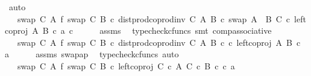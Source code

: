 \begin{isabellebody}
\ auto\isanewline
\ \ \isamarkupfalse%
\ \isamarkupfalse%
\ {\isachardoublequoteopen}{\isachardot}{\kern0pt}{\isachardot}{\kern0pt}{\isachardot}{\kern0pt}\ {\isacharequal}{\kern0pt}\ {\isacharparenleft}{\kern0pt}swap\ C\ A\ {\isasymbowtie}\isactrlsub f\ swap\ C\ B{\isacharparenright}{\kern0pt}\ {\isasymcirc}\isactrlsub c\ dist{\isacharunderscore}{\kern0pt}prod{\isacharunderscore}{\kern0pt}coprod{\isacharunderscore}{\kern0pt}inv\ C\ A\ B\ {\isasymcirc}\isactrlsub c\ swap\ {\isacharparenleft}{\kern0pt}A\ {\isasymCoprod}\ B{\isacharparenright}{\kern0pt}\ C\ {\isasymcirc}\isactrlsub c\ {\isasymlangle}left{\isacharunderscore}{\kern0pt}coproj\ A\ B\ {\isasymcirc}\isactrlsub c\ a{\isacharcomma}{\kern0pt}\ c{\isasymrangle}{\isachardoublequoteclose}\isanewline
\ \ \ \ \isamarkupfalse%
\ assms\ \isamarkupfalse%
\ {\isacharparenleft}{\kern0pt}typecheck{\isacharunderscore}{\kern0pt}cfuncs{\isacharcomma}{\kern0pt}\ smt\ comp{\isacharunderscore}{\kern0pt}associative{}{\isacharparenright}{\kern0pt}\isanewline
\ \ \isamarkupfalse%
\ \isamarkupfalse%
\ {\isachardoublequoteopen}{\isachardot}{\kern0pt}{\isachardot}{\kern0pt}{\isachardot}{\kern0pt}\ {\isacharequal}{\kern0pt}\ {\isacharparenleft}{\kern0pt}swap\ C\ A\ {\isasymbowtie}\isactrlsub f\ swap\ C\ B{\isacharparenright}{\kern0pt}\ {\isasymcirc}\isactrlsub c\ dist{\isacharunderscore}{\kern0pt}prod{\isacharunderscore}{\kern0pt}coprod{\isacharunderscore}{\kern0pt}inv\ C\ A\ B\ {\isasymcirc}\isactrlsub c\ {\isasymlangle}c{\isacharcomma}{\kern0pt}\ left{\isacharunderscore}{\kern0pt}coproj\ A\ B\ {\isasymcirc}\isactrlsub c\ a{\isasymrangle}{\isachardoublequoteclose}\isanewline
\ \ \ \ \isamarkupfalse%
\ assms\ swap{\isacharunderscore}{\kern0pt}ap\ \isamarkupfalse%
\ {\isacharparenleft}{\kern0pt}typecheck{\isacharunderscore}{\kern0pt}cfuncs{\isacharcomma}{\kern0pt}\ auto{\isacharparenright}{\kern0pt}\isanewline
\ \ \isamarkupfalse%
\ \isamarkupfalse%
\ {\isachardoublequoteopen}{\isachardot}{\kern0pt}{\isachardot}{\kern0pt}{\isachardot}{\kern0pt}\ {\isacharequal}{\kern0pt}\ {\isacharparenleft}{\kern0pt}swap\ C\ A\ {\isasymbowtie}\isactrlsub f\ swap\ C\ B{\isacharparenright}{\kern0pt}\ {\isasymcirc}\isactrlsub c\ left{\isacharunderscore}{\kern0pt}coproj\ {\isacharparenleft}{\kern0pt}C\ {\isasymtimes}\isactrlsub c\ A{\isacharparenright}{\kern0pt}\ {\isacharparenleft}{\kern0pt}C\ {\isasymtimes}\isactrlsub c\ B{\isacharparenright}{\kern0pt}\ {\isasymcirc}\isactrlsub c\ {\isasymlangle}c{\isacharcomma}{\kern0pt}\ a{\isasymrangle}{\isachardoublequoteclose}\isanewline

\end{isabellebody}
